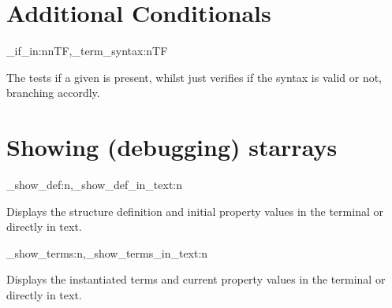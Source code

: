 \documentclass[10pt]{article}
\begin{document}


\section{Additional Conditionals}\label{pack:extra}

\begin{codedescribe}{\starray_if_in:nnTF,\starray_term_syntax:nTF}
\begin{codesyntax}%
\end{codesyntax}
\end{codedescribe}
The  tests if a given  is present, whilst   just verifies if the  syntax is valid or not, branching accordly.


\section{Showing (debugging) starrays }\label{pack:show}

\begin{codedescribe}{\starray_show_def:n,\starray_show_def_in_text:n}
\begin{codesyntax}%
\end{codesyntax}
\end{codedescribe}
Displays the  structure definition and initial property values in the terminal or directly in text.

\begin{codedescribe}{\starray_show_terms:n,\starray_show_terms_in_text:n}
\begin{codesyntax}%
\end{codesyntax}
\end{codedescribe}
Displays the  instantiated terms and current  property values in the terminal or directly in text.
\end{document}
